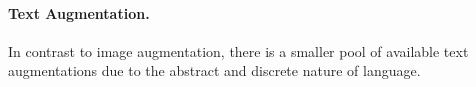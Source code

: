 \documentclass[letterpaper]{article} %
\begin{document}

\paragraph{Text Augmentation.}
In contrast to image augmentation, there is a smaller pool of available text augmentations due to the abstract and discrete nature of language. 
\end{document}
